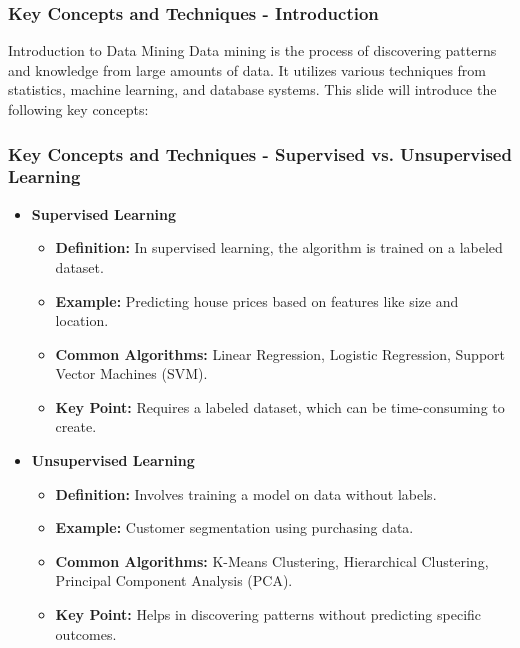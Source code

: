 \documentclass{beamer}
\begin{document}
\begin{frame}[fragile]
    \frametitle{Key Concepts and Techniques - Introduction}
    \begin{block}{Introduction to Data Mining}
        Data mining is the process of discovering patterns and knowledge from large amounts of data. It utilizes various techniques from statistics, machine learning, and database systems. This slide will introduce the following key concepts:
    \end{block}
\end{frame}

\begin{frame}[fragile]
    \frametitle{Key Concepts and Techniques - Supervised vs. Unsupervised Learning}
    \begin{itemize}
        \item \textbf{Supervised Learning}
        \begin{itemize}
            \item \textbf{Definition:} In supervised learning, the algorithm is trained on a labeled dataset.
            \item \textbf{Example:} Predicting house prices based on features like size and location.
            \item \textbf{Common Algorithms:} Linear Regression, Logistic Regression, Support Vector Machines (SVM).
            \item \textbf{Key Point:} Requires a labeled dataset, which can be time-consuming to create.
        \end{itemize}
        
        \item \textbf{Unsupervised Learning}
        \begin{itemize}
            \item \textbf{Definition:} Involves training a model on data without labels.
            \item \textbf{Example:} Customer segmentation using purchasing data.
            \item \textbf{Common Algorithms:} K-Means Clustering, Hierarchical Clustering, Principal Component Analysis (PCA).
            \item \textbf{Key Point:} Helps in discovering patterns without predicting specific outcomes.
        \end{itemize}
    \end{itemize}
\end{frame}
\end{document}
